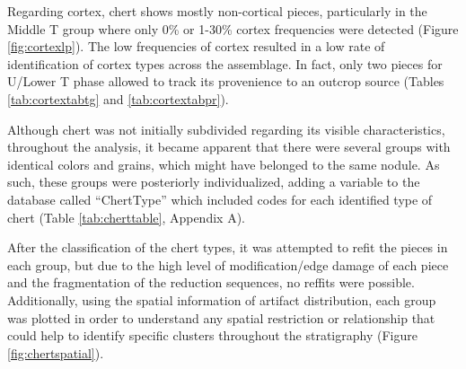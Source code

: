 \documentclass[12pt,twoside]{reedthesis}
\begin{document}
Regarding cortex, chert shows mostly non-cortical pieces, particularly in the Middle T group where only 0\% or 1-30\% cortex frequencies were detected (Figure \ref{fig:cortexlp}). The low frequencies of cortex resulted in a low rate of identification of cortex types across the assemblage. In fact, only two pieces for U/Lower T phase allowed to track its provenience to an outcrop source (Tables \ref{tab:cortextabtg} and \ref{tab:cortextabpr}).

Although chert was not initially subdivided regarding its visible characteristics, throughout the analysis, it became apparent that there were several groups with identical colors and grains, which might have belonged to the same nodule. As such, these groups were posteriorly individualized, adding a variable to the database called ``ChertType'' which included codes for each identified type of chert (Table \ref{tab:cherttable}, Appendix A).

After the classification of the chert types, it was attempted to refit the pieces in each group, but due to the high level of modification/edge damage of each piece and the fragmentation of the reduction sequences, no reffits were possible. Additionally, using the spatial information of artifact distribution, each group was plotted in order to understand any spatial restriction or relationship that could help to identify specific clusters throughout the stratigraphy (Figure \ref{fig:chertspatial}).
\end{document}
